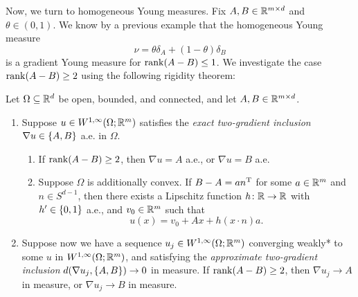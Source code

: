 Now, we turn to homogeneous Young measures. Fix $A,B \in \mathbb{R}^{m \times d}$ and $\theta \in (0,1)$. We know by a previous example that the homogeneous Young measure 
\begin{equation}
    \nu = \theta \delta_A + (1-\theta) \delta_B
\end{equation}
is a gradient Young measure for $\operatorname{\mathrm{rank}}(A - B) \leq 1$. We investigate the case $\operatorname{\mathrm{rank}}(A - B) \geq 2$ using the following rigidity theorem:
\begin{theorem}
    Let $\Omega \subseteq \mathbb{R}^d$ be open, bounded, and connected, and let $A, B \in \mathbb{R}^{m \times d}$.
    \begin{enumerate}[label = {\rm (\roman*)}]
        \item Suppose $u \in W^{1,\infty}(\Omega;\mathbb{R}^m)$ satisfies the \textit{exact two-gradient inclusion} $\nabla u \in \left\{ {A,B} \right\}$ a.e. in $\Omega$.
        \begin{enumerate}[label = {\rm (\alph*)}]
            \item If $\operatorname{\mathrm{rank}}(A-B) \geq 2$, then $\nabla u = A$ a.e., or $\nabla u = B$ a.e.
            \item Suppose $\Omega$ is additionally convex. If $B - A = an^{\mathrm{T}}$ for some $a \in \mathbb{R}^m$ and $n \in S^{d-1}$, then there exists a Lipschitz function $h \colon \mathbb{R} \to \mathbb{R}$ with $h' \in \left\{ {0,1} \right\}$ a.e., and $v_0 \in \mathbb{R}^m$ such that 
            \begin{equation}
                u(x) = v_0 + A x + h(x \cdot n) a.
            \end{equation}
        \end{enumerate}

        \item Suppose now we have a sequence $u_j \in W^{1,\infty}(\Omega;\mathbb{R}^m)$ converging weakly* to some $u$ in $W^{1,\infty}(\Omega;\mathbb{R}^m)$, and satisfying the \textit{approximate two-gradient inclusion} $d(\nabla u_j, \left\{ {A,B} \right\}) \to 0$ in measure. If $\operatorname{\mathrm{rank}}(A-B) \geq 2$, then $\nabla u_j \to A$ in measure, or $\nabla u_j \to B$ in measure.
    \end{enumerate}
\end{theorem}
